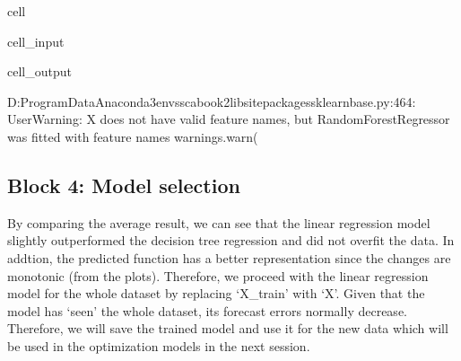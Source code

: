 \documentclass[letterpaper,10pt,english]{jupyterBook}
\begin{document}
\begin{sphinxuseclass}{cell}\begin{sphinxVerbatimInput}

\begin{sphinxuseclass}{cell_input}
\begin{sphinxVerbatim}[commandchars=\\\{\}]
  
  
\end{sphinxVerbatim}

\end{sphinxuseclass}\end{sphinxVerbatimInput}
\begin{sphinxVerbatimOutput}

\begin{sphinxuseclass}{cell_output}
\begin{sphinxVerbatim}[commandchars=\\\{\}]
D:\PYGZbs{}ProgramData\PYGZbs{}Anaconda3\PYGZbs{}envs\PYGZbs{}sca\PYGZus{}book2\PYGZbs{}lib\PYGZbs{}site\PYGZhy{}packages\PYGZbs{}sklearn\PYGZbs{}base.py:464: UserWarning: X does not have valid feature names, but RandomForestRegressor was fitted with feature names
  warnings.warn(
\end{sphinxVerbatim}

\noindent{}

\end{sphinxuseclass}\end{sphinxVerbatimOutput}

\end{sphinxuseclass}

\subsection{Block 4: Model selection}
\label{\detokenize{docs/Case1_1_Simple_Retail_Demand_Model:block-4-model-selection}}
\sphinxAtStartPar
By comparing the average result, we can see that the linear regression model slightly outperformed the decision tree regression and did not overfit the data. In addtion, the predicted function has a better representation since the changes are monotonic (from the plots). Therefore, we proceed with the linear regression model for the whole dataset by replacing ‘X\_train’ with ‘X’. Given that the model has ‘seen’ the whole dataset, its forecast errors normally decrease. Therefore, we will save the trained model and use it for the new data which will be used in the optimization models in the next session.
\end{document}
